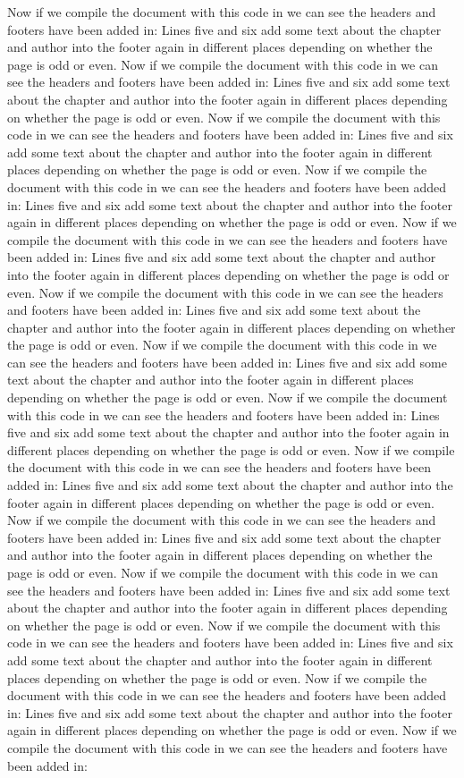  \par Now if we compile the document with this code in we can see the headers and footers have been added in: Lines five and six add some text about the chapter and author into the footer again in different places depending on whether the page is odd or even. Now if we compile the document with this code in we can see the headers and footers have been added in: Lines five and six add some text about the chapter and author into the footer again in different places depending on whether the page is odd or even. Now if we compile the document with this code in we can see the headers and footers have been added in: Lines five and six add some text about the chapter and author into the footer again in different places depending on whether the page is odd or even. Now if we compile the document with this code in we can see the headers and footers have been added in: Lines five and six add some text about the chapter and author into the footer again in different places depending on whether the page is odd or even. Now if we compile the document with this code in we can see the headers and footers have been added in: Lines five and six add some text about the chapter and author into the footer again in different places depending on whether the page is odd or even. Now if we compile the document with this code in we can see the headers and footers have been added in: Lines five and six add some text about the chapter and author into the footer again in different places depending on whether the page is odd or even. Now if we compile the document with this code in we can see the headers and footers have been added in: Lines five and six add some text about the chapter and author into the footer again in different places depending on whether the page is odd or even. Now if we compile the document with this code in we can see the headers and footers have been added in: Lines five and six add some text about the chapter and author into the footer again in different places depending on whether the page is odd or even. Now if we compile the document with this code in we can see the headers and footers have been added in: Lines five and six add some text about the chapter and author into the footer again in different places depending on whether the page is odd or even. Now if we compile the document with this code in we can see the headers and footers have been added in: Lines five and six add some text about the chapter and author into the footer again in different places depending on whether the page is odd or even. Now if we compile the document with this code in we can see the headers and footers have been added in: Lines five and six add some text about the chapter and author into the footer again in different places depending on whether the page is odd or even. Now if we compile the document with this code in we can see the headers and footers have been added in: Lines five and six add some text about the chapter and author into the footer again in different places depending on whether the page is odd or even. Now if we compile the document with this code in we can see the headers and footers have been added in: Lines five and six add some text about the chapter and author into the footer again in different places depending on whether the page is odd or even. Now if we compile the document with this code in we can see the headers and footers have been added in: